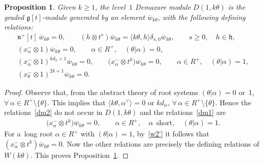 \documentclass[10pt,a4paper]{amsart}
\newtheorem{proposition}{Proposition}
\begin{document}
\begin{proposition}
\label{WvsD}
Given $k\geq 1$, the level~$1$ Demazure module $D(1,k\theta)$ is the graded $\mathfrak{g}[t]$-module generated by an
element $\overline{w}_{k\theta}$, with the following defining relations:
\begin{gather*}
\mathfrak{n}^{+}[t]\, \overline{w}_{k\theta}=0,
\qquad
(h \otimes t^s) \overline{w}_{k\theta} = \langle k\theta, h\rangle \delta_{s,0} \overline{w}_{k\theta},
\qquad
s\geq0,
\quad
h\in\mathfrak{h},
\\
(x^{-}_{\alpha}\otimes 1) \overline{w}_{k\theta}=0,
\qquad
\alpha\in R^+,
\quad
(\theta|\alpha)=0,
\\
(x^{-}_{\alpha} \otimes 1)^{kd_{\alpha}+1} \overline{w}_{k\theta}=0,
\qquad
\big(x^{-}_{\alpha} \otimes t^k\big) \overline{w}_{k\theta}=0,
\qquad
\alpha\in R^+,
\quad
(\theta|\alpha)=1,
\\
(x^{-}_{\theta} \otimes 1)^{2k+1} \overline{w}_{k\theta}=0.
\end{gather*}
\end{proposition}

\begin{proof}
Observe that, from the abstract theory of root systems $(\theta|\alpha)= 0$ or~1,
$\forall\, \alpha \in R^{+}\setminus \{\theta\}$.
This implies that $\langle k\theta, \alpha^{\vee}\rangle = 0$ or $kd_{\alpha}$, $\forall\, \alpha \in R^{+}\setminus \{\theta\}$.
Hence the relations~\eqref{dm2} do not occur in $D(1,k\theta)$ and the relations~\eqref{dm1} are
\begin{gather*}
\big(x^{-}_{\alpha} \otimes t^k\big) \overline{w}_{k\theta}=0,
\qquad
\alpha\in R^+,
\quad
\alpha~~\text{short},
\quad
(\theta|\alpha)=1.
\end{gather*}
For a~long root $\alpha\in R^+$ with $(\theta|\alpha)=1$, by~\eqref{w2'} it follows that $(x^{-}_{\alpha} \otimes t^k) \overline{w}_{k\theta}=0$.
Now the other relations are precisely the def\/ining relations of $W(k\theta)$. This proves Proposition~\ref{WvsD}.
\end{proof}
\end{document}
